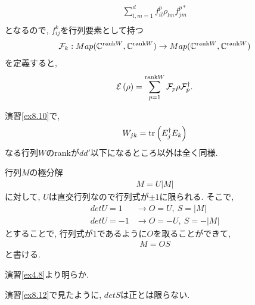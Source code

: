 \begin{ex}
\begin{align*}
        \sum_{l,m = 1}^d f_{il}^{p} \rho_{lm} f_{jm}^{p*}                  \\
    \end{align*}
    となるので, $f_{ij}^k$を行列要素として持つ
    \begin{align*}
        \mathcal{F}_k : Map(\mathbb{C}^{\mathrm{rank}W}, \mathbb{C}^{\mathrm{rank}W}) \to Map(\mathbb{C}^{\mathrm{rank}W}, \mathbb{C}^{\mathrm{rank}W})
    \end{align*}
    を定義すると,
    \begin{align*}
        \mathcal{E}\left( \rho \right) = \sum_{p=1}^{\mathrm{rank}W} \mathcal{F}_p \rho \mathcal{F}_p^\dagger.
    \end{align*}
\end{ex}

\begin{ex}
    \label{ex8.11}
    演習\ref{ex8.10}で,
    \begin{align*}
        W_{jk} = \mathrm{tr}\left( E_j^\dagger E_k\right)
    \end{align*}
    なる行列$W$のrankが$dd'$以下になるところ以外は全く同様.
\end{ex}

\begin{ex}
    \label{ex8.12}
    行列$M$の極分解
    \begin{align*}
        M = U |M|
    \end{align*}
    に対して, $U$は直交行列なので行列式が$\pm1$に限られる. そこで,
    \begin{align*}
        det U = 1  & \to O = U, \ S = |M|  \\
        det U = -1 & \to O = -U, \ S = -|M|
    \end{align*}
    とすることで, 行列式が1であるように$O$を取ることができて,
    \begin{align*}
        M = OS
    \end{align*}
    と書ける.
\end{ex}

\begin{ex}
    \label{ex8.13}
    演習\ref{ex4.8}より明らか.
\end{ex}

\begin{ex}
    \label{ex8.14}
    演習\ref{ex8.12}で見たように, $det S$は正とは限らない.
\end{ex}

